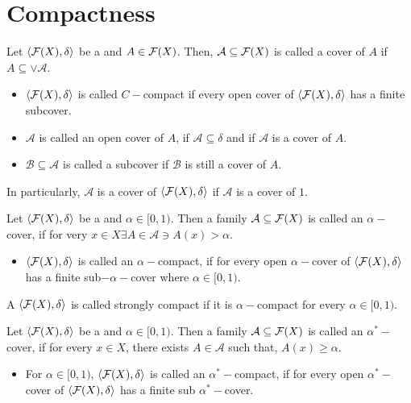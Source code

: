 \documentclass[../main-sheet.tex]{subfiles}
\begin{document}
\chapter{Compactness}
\begin{defn}
    Let \(\langle \mathcal{F}(X), \delta \rangle\) be a \fts\s and \(A\in\mathcal{F}(X) \). Then, \(\mathcal{A }\subseteq \mathcal{F}(X) \) is called a cover of \(A \) if \(A\subseteq \vee \mathcal{A }\).
    \begin{itemize}
        \item \(\langle \mathcal{F}(X), \delta \rangle\) is called \(C-\)compact if every open cover of \(\langle \mathcal{F}(X), \delta \rangle\) has a finite subcover.
        \item \(\mathcal{A }\) is called an open cover of \(A \), if \(\mathcal{A }\subseteq \delta\) and if \(\mathcal{A }\) is a cover of \(A \).
        \item \(\mathcal{B }\subseteq \mathcal{A }\) is called a subcover if \(\mathcal{B }\) is still a cover of \(A \).
    \end{itemize}
    In particularly, \(\mathcal{ A }\) is a cover of \(\langle \mathcal{F}(X), \delta \rangle\) if \(\mathcal{ A }\) is a cover of \(\underbar{1}\).
\end{defn}
\begin{defn}
    Let \(\langle \mathcal{F}(X), \delta \rangle\) be a \fts\s and \(\alpha\in[0,1)\). Then a family \(\mathcal{A }\subseteq \mathcal{F}(X)\) is called an \(\alpha-\)cover, if for very \(x\in X \exists A\in\mathcal{A } \ni A(x)>\alpha\).
    \begin{itemize}
        \item \(\langle \mathcal{F}(X), \delta \rangle\) is called an \(\alpha-\)compact, if for every open \(\alpha-\)cover of \(\langle \mathcal{F}(X), \delta \rangle\) has a finite sub\(-\alpha-\)cover where \(\alpha\in[0,1)\).
    \end{itemize}
\end{defn}
\begin{defn}
    A \fts\s\(\langle \mathcal{F}(X), \delta \rangle\) is called strongly compact if it is \(\alpha-\)compact for every \(\alpha\in[0,1)\).
\end{defn}
\begin{defn}
    Let \(\langle \mathcal{F}(X), \delta \rangle\) be a \fts\s and \(\alpha\in[0,1)\). Then a family \(\mathcal{A }\subseteq\mathcal{F}(X)\) is called an \(\alpha^*-\)cover, if for every \(x\in X \), there exists \(A\in \mathcal{A }\) such that, \(A(x)\geq \alpha\).
    \begin{itemize}
        \item For \(\alpha\in[0,1)\), \(\langle \mathcal{F}(X), \delta \rangle\) is called an \(\alpha^*-\)compact, if for every open \(\alpha^*-\)cover of \(\langle \mathcal{F}(X), \delta \rangle\) has a finite sub \(\alpha^*-\)cover.
    \end{itemize}
\end{defn}
\end{document}
